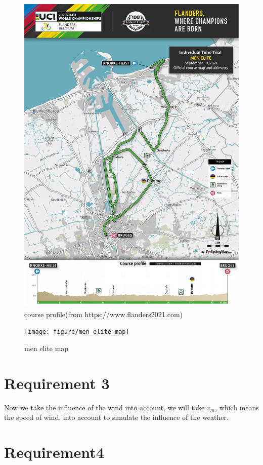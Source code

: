 \documentclass[12pt]{article}
\begin{document}
\begin{figure}
    \centering
    \includegraphics[width=1\columnwidth]{men-elite-individual-time-tria-map}
    \caption{course profile(from https://www.flanders2021.com)}
\end{figure}

\begin{figure}
    \centering
    \texttt{[image: figure/men\_elite\_map]}
    \caption{men elite map}
    \label{figure}
\end{figure}

\section{Requirement 3}
Now we take the influence of the wind into account, we will take $v_m$, which means the speed of wind, into account to simulate the influence of the weather.
\section{Requirement4}
\end{document}
